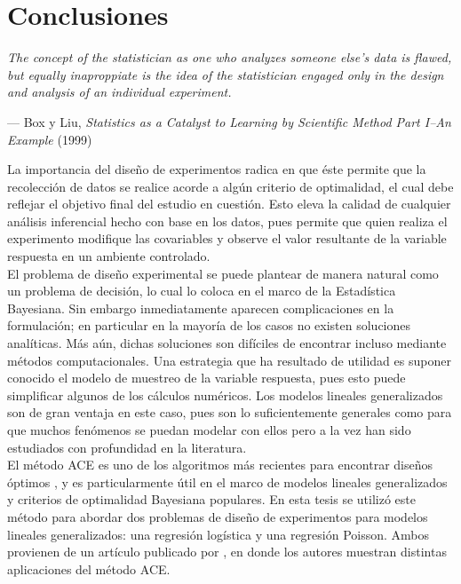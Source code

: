 \chapter{Conclusiones} \label{chapter:conclusiones}

\epigraph{\textit{The concept of the statistician as one who analyzes someone else's data is flawed, but equally inaproppiate is the idea of the statistician engaged only in the design and analysis of an individual experiment.}}{--- Box y Liu, \textit{Statistics as a Catalyst to Learning by Scientific Method Part I--An Example} (1999)}




La importancia del diseño de experimentos radica en que éste permite que la recolección de datos se realice acorde a algún criterio de optimalidad, el cual debe reflejar el objetivo final del estudio en cuestión. Esto eleva la calidad de cualquier análisis inferencial hecho con base en los datos, pues permite que quien realiza el experimento modifique las covariables y observe el valor resultante de la variable respuesta en un ambiente controlado. \\




El problema de diseño experimental se puede plantear de manera natural como un problema de decisión, lo cual lo coloca en el marco de la Estadística Bayesiana. Sin embargo inmediatamente aparecen complicaciones en la formulación; en particular en la mayoría de los casos no existen soluciones analíticas. Más aún, dichas soluciones son difíciles de encontrar incluso mediante métodos computacionales. Una estrategia que ha resultado de utilidad es suponer conocido el modelo de muestreo de la variable respuesta, pues esto puede simplificar algunos de los cálculos numéricos. Los modelos lineales generalizados son de gran ventaja en este caso, pues son lo suficientemente generales como para que muchos fenómenos se puedan modelar con ellos pero a la vez han sido estudiados con profundidad en la literatura. \\




El método ACE es uno de los algoritmos más recientes para encontrar diseños óptimos \citep{Woods_ACE}, y es particularmente útil en el marco de modelos lineales generalizados y criterios de optimalidad Bayesiana populares. En esta tesis se utilizó este método para abordar dos problemas de diseño de experimentos para modelos lineales generalizados: una regresión logística y una regresión Poisson. Ambos provienen de un artículo publicado por \cite{Woods_etal}, en donde los autores muestran distintas aplicaciones del método ACE. \\




